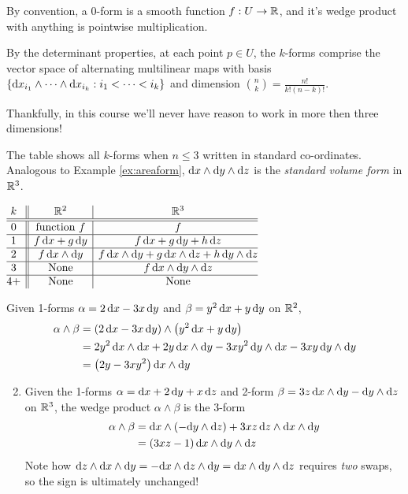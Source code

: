 By convention, a 0-form is a smooth function $f:U\to\mathbb{R}$, and it's wedge product with anything is pointwise multiplication.\smallbreak


By the determinant properties, at each point $p\in U$, the $k$-forms comprise the vector space of alternating multilinear maps with basis $\{{\mathrm{d} x}_{i_1}\wedge\cdots\wedge{\mathrm{d}x}_{i_k}:i_1<\cdots<i_k\}$ and dimension $\binom nk=\frac{n!}{k!(n-k)!}$.\smallbreak

Thankfully, in this course we'll never have reason to work in more then three dimensions!\smallbreak




\begin{minipage}[t]{0.44\linewidth}\vspace{0pt}
The table shows all $k$-forms when $n\le 3$ written in standard co-ordinates.\smallbreak
Analogous to Example \ref{ex:areaform}, ${\mathrm{d} x}\wedge{\mathrm{d}y}\wedge{\mathrm{d}z}$ is the \emph{standard volume form} in $\mathbb{R}^3$.
\end{minipage}\hfill\begin{minipage}[t]{0.52\linewidth}\vspace{0pt}
\flushright$\begin{array}{@{}c||c|c@{}}
	k&\R^2&\R^3\\\hline\hline
	0&\text{function }f&f\\\hline
	1&f\,\dx+g\,\dy & f\,\dx+g\,\dy+h\,\dz\\\hline
	2&f\,\dx\wedge\dy&f\,\dx\wedge\dy+g\,\dx\wedge\dz +h\,\dy\wedge\dz\\\hline
	3&\text{None}&f\,\dx\wedge\dy\wedge\dz\\\hline
	4+&\text{None}&\text{None}
\end{array}$
\end{minipage}


\begin{examples}{}{}
	\exstart Given 1-forms $\alpha=2\,{\mathrm{d} x}-3x\,{\mathrm{d} y}$ and $\beta=y^2\,{\mathrm{d} x}+y\,{\mathrm{d} y}$ on $\mathbb{R}^2$,
	\begin{align*}
		\alpha\wedge\beta&=(2\,{\mathrm{d} x}-3x\,{\mathrm{d} y})\wedge\bigl(y^2\,{\mathrm{d} x}+y\,{\mathrm{d} y}\bigr)\\
		&=2y^2\,{\mathrm{d} x}\wedge{\mathrm{d}x} +2y\,{\mathrm{d} x}\wedge{\mathrm{d}y} -3xy^2\,{\mathrm{d} y}\wedge{\mathrm{d}x} -3xy\,{\mathrm{d} y}\wedge{\mathrm{d}y}\\
		&=\bigl(2y-3xy^2\bigr)\,{\mathrm{d} x}\wedge{\mathrm{d}y}
	\end{align*}
	
	\begin{enumerate}\setcounter{enumi}{1}
		\item Given the 1-forms $\alpha={\mathrm{d} x}+2\,{\mathrm{d} y}+x\,{\mathrm{d} z}$ and 2-form $\beta=3z\,{\mathrm{d} x}\wedge{\mathrm{d}y}-{\mathrm{d} y}\wedge{\mathrm{d}z}$ on $\mathbb{R}^3$, the wedge product $\alpha\wedge\beta$ is the 3-form
		\begin{align*}
		\alpha\wedge\beta&={\mathrm{d} x}\wedge(-{\mathrm{d} y}\wedge{\mathrm{d}z})+3xz\,{\mathrm{d} z}\wedge{\mathrm{d}x}\wedge{\mathrm{d}y}\\
		&=(3xz-1)\,{\mathrm{d} x}\wedge{\mathrm{d}y}\wedge{\mathrm{d}z}
		\end{align*}
		Note how ${\mathrm{d} z}\wedge{\mathrm{d}x}\wedge{\mathrm{d}y}=-{\mathrm{d} x}\wedge{\mathrm{d}z}\wedge{\mathrm{d}y}={\mathrm{d} x}\wedge{\mathrm{d}y}\wedge{\mathrm{d}z}$ requires \emph{two} swaps, so the sign is ultimately unchanged!
	\end{enumerate}
\end{examples}



